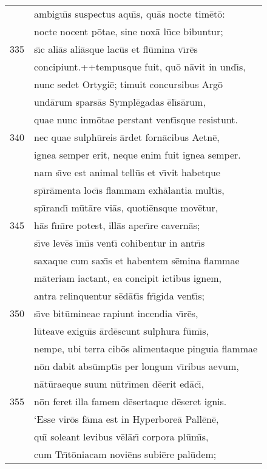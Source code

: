 \documentclass[paper=6in:9in,pagesize=pdftex,
               headinclude=on,footinclude=on,12pt]{scrbook}
\begin{document}
\begin{longtable}[p]{ r l }
 & ambigu\={\i}s suspectus aqu\={\i}s, qu\=as nocte tim\=et\=o:\\ 
 & nocte nocent p\=otae, sine nox\=a l\=uce bibuntur;\\ 
335 & s\={\i}c ali\=as ali\=asque lac\=us et fl\=umina v\={\i}r\=es\\ 
 & concipiunt.++tempusque fuit, qu\=o n\=avit in und\={\i}s,\\ 
 & nunc sedet Ortygi\=e; timuit concursibus Arg\=o\\ 
 & und\=arum spars\=as Sympl\=egadas \=el\={\i}s\=arum,\\ 
 & quae nunc inm\=otae perstant vent\={\i}sque resistunt.\\ 
340 & nec quae sulph\=ureis \=ardet forn\=acibus Aetn\=e,\\ 
 & ignea semper erit, neque enim fuit ignea semper.\\ 
 & nam s\={\i}ve est animal tell\=us et v\={\i}vit habetque\\ 
 & sp\={\i}r\=amenta loc\={\i}s flammam exh\=alantia mult\={\i}s,\\ 
 & sp\={\i}rand\={\i} m\=ut\=are vi\=as, quoti\=ensque mov\=etur,\\ 
345 & h\=as f\={\i}n\={\i}re potest, ill\=as aper\={\i}re cavern\=as;\\ 
 & s\={\i}ve lev\=es \={\i}m\={\i}s vent\={\i} cohibentur in antr\={\i}s\\ 
 & saxaque cum sax\={\i}s et habentem s\=emina flammae\\ 
 & m\=ateriam iactant, ea concipit ictibus ignem,\\ 
 & antra relinquentur s\=ed\=at\={\i}s fr\={\i}gida vent\={\i}s;\\ 
350 & s\={\i}ve bit\=umineae rapiunt incendia v\={\i}r\=es,\\ 
 & l\=uteave exigu\={\i}s \=ard\=escunt sulphura f\=um\={\i}s,\\ 
 & nempe, ubi terra cib\=os alimentaque pinguia flammae\\ 
 & n\=on dabit abs\=umpt\={\i}s per longum v\={\i}ribus aevum,\\ 
 & n\=at\=uraeque suum n\=utr\={\i}men d\=eerit ed\=ac\={\i},\\ 
355 & n\=on feret illa famem d\=esertaque d\=eseret ignis.\\ 
 & \indent `Esse vir\=os f\=ama est in Hyperbore\=a Pall\=en\=e,\\ 
 & qu\={\i} soleant levibus v\=el\=ar\={\i} corpora pl\=um\={\i}s,\\ 
 & cum Tr\={\i}t\=oniacam novi\=ens subi\=ere pal\=udem;\\ 

\end{longtable}
\end{document}
